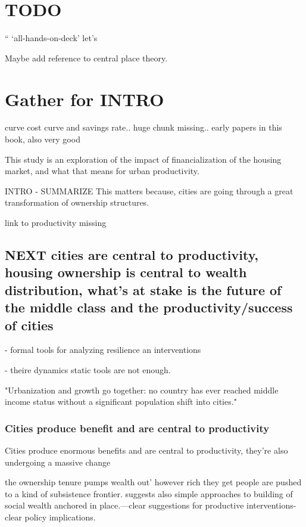\chapter{TODO}
“
‘all-hands-on-deck’
let’s


Maybe add reference to central place theory. %

\chapter{Gather for INTRO}


\cite{spenceUrbanizationGrowth2009} 
curve cost curve and savings rate.. huge chunk missing..
early papers in this book, also very good


This study is an exploration of the impact of financialization of the housing market, and what that means for urban productivity.

INTRO - SUMMARIZE 
This matters because, %
cities are going through a great transformation of ownership structures. 

link to productivity missing


\section{NEXT cities are central to productivity, housing ownership is central to wealth distribution, what's at stake is the future of the middle class and the productivity/success of cities}
- formal tools for analyzing resilience an interventions

- theire dynamics static tools are not enough. 

"Urbanization and growth go together: no country has ever reached middle income status without a significant population shift into cities." \cite{annezUrbanizationGrowthSetting2009} %

\subsection{Cities produce benefit and are central to productivity}
Cities produce enormous benefits and are central to productivity, they're also undergoing a massive change

the ownership tenure pumps wealth out'
however rich they get people are pushed to a kind of subsistence frontier. 
suggests also simple approaches to building of social wealth anchored in place.---clear suggestions for productive interventions- clear policy implications. 

